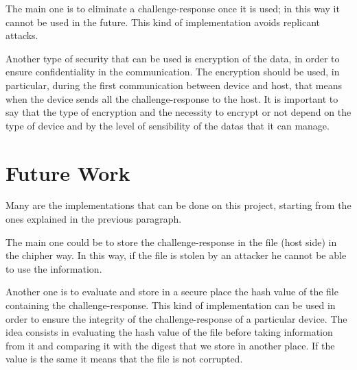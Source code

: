 The main one is to eliminate a challenge-response once it is used; in this way it cannot be used in the future. This kind of implementation avoids replicant attacks.


Another type of security that can be used is encryption of the data, in order to ensure confidentiality in the communication. The encryption should be used, in particular, during the first communication between device and host, that means when the device sends all the challenge-response to the host.
It is important to say that the type of encryption and the necessity to encrypt or not depend on the type of device and by the level of sensibility of the datas that it can manage.


\section{Future Work}
Many are the implementations that can be done on this project, starting from the ones explained in the previous paragraph.


The main one could be to store the challenge-response in the file (host side) in the chipher way. In this way, if the file is stolen by an attacker he cannot be able to use the information.

Another one is to evaluate and store in a secure place the hash value of the file containing the challenge-response.
This kind of implementation can be used in order to ensure the integrity of the challenge-response of a particular device.
The idea consists in evaluating the hash value of the file before taking information from it and comparing it with the digest that we store in another place.
If the value is the same it means that the file is not corrupted.



